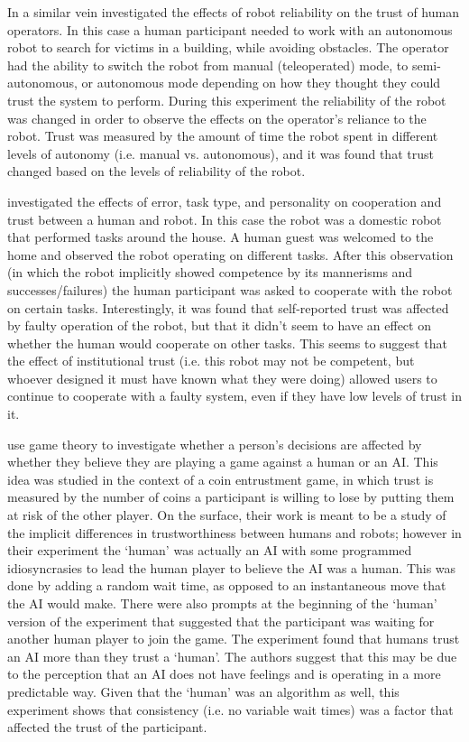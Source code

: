In a similar vein \citet{Desai2012-rc} investigated the effects of robot reliability on the trust of human operators. In this case a human participant needed to work with an autonomous robot to search for victims in a building, while avoiding obstacles. The operator had the ability to switch the robot from manual (teleoperated) mode, to semi-autonomous, or autonomous mode depending on how they thought they could trust the system to perform. During this experiment the reliability of the robot was changed in order to observe the effects on the operator's reliance to the robot. Trust was measured by the amount of time the robot spent in different levels of autonomy (i.e. manual vs. autonomous), and it was found that trust changed based on the levels of reliability of the robot.

\citet{Salem2015-md} investigated the effects of error, task type, and personality on cooperation and trust between a human and robot. In this case the robot was a domestic robot that performed tasks around the house. A human guest was welcomed to the home and observed the robot operating on different tasks. After this observation (in which the robot implicitly showed competence by its mannerisms and successes/failures) the human participant was asked to cooperate with the robot on certain tasks. Interestingly, it was found that self-reported trust was affected by faulty operation of the robot, but that it didn't seem to have an effect on whether the human would cooperate on other tasks. This seems to suggest that the effect of institutional trust (i.e. this robot may not be competent, but whoever designed it must have known what they were doing) allowed users to continue to cooperate with a faulty system, even if they have low levels of trust in it.

\citet{Wu2016-ei} use game theory to investigate whether a person's decisions are affected by whether they believe they are playing a game against a human or an AI. This idea was studied in the context of a coin entrustment game, in which trust is measured by the number of coins a participant is willing to lose by putting them at risk of the other player. On the surface, their work is meant to be a study of the implicit differences in trustworthiness between humans and robots; however in their experiment the `human' was actually an AI with some programmed idiosyncrasies to lead the human player to believe the AI was a human. This was done by adding a random wait time, as opposed to an instantaneous move that the AI would make. There were also prompts at the beginning of the `human' version of the experiment that suggested that the participant was waiting for another human player to join the game. The experiment found that humans trust an AI more than they trust a `human'. The authors suggest that this may be due to the perception that an AI does not have feelings and is operating in a more predictable way. Given that the `human' was an algorithm as well, this experiment shows that consistency (i.e. no variable wait times) was a factor that affected the trust of the participant.

